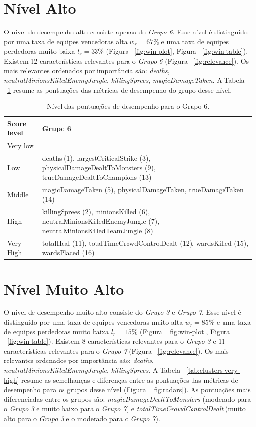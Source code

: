 \section{Nível Alto}
O nível de desempenho alto consiste apenas do \textit{Grupo 6}. Esse nível é distinguido por uma taxa de equipes vencedoras alta $w_r = 67 \%$ e uma taxa de equipes perdedoras muito baixa $l_r = 33 \%$ (Figura ~\ref{fig:win-plot}, Figura ~\ref{fig:win-table}). Existem 12 características relevantes para o \textit{Grupo 6} (Figura ~\ref{fig:relevance}). Os mais relevantes ordenados por importância são: \textit{deaths}, \textit{neutralMinionsKilledEnemyJungle}, \textit{killingSprees}, \textit{magicDamageTaken}. A Tabela ~\ref{tab:clusters-high} resume as pontuações das métricas de desempenho do grupo desse nível.

\begin{table}
  \scriptsize
  \caption{Nível das pontuações de desempenho para o Grupo 6.}
  \label{tab:clusters-high}
  \begin{tabular}{p{}p{}}
    \toprule
    \textbf{Score level} & \textbf{Grupo 6} \\
    \midrule
Very low &  \\
    \hline
Low & deaths (1), largestCriticalStrike (3), physicalDamageDealtToMonsters (9), trueDamageDealtToChampions (13) \\
    \hline
Middle & magicDamageTaken (5), physicalDamageTaken, trueDamageTaken (14)  \\
    \hline
High & killingSprees (2), minionsKilled (6), neutralMinionsKilledEnemyJungle (7), neutralMinionsKilledTeamJungle (8) \\
    \hline
Very High & totalHeal (11), totalTimeCrowdControlDealt (12), wardsKilled (15), wardsPlaced (16) \\ 
  \bottomrule
\end{tabular}
\end{table}

\section{Nível Muito Alto}
O nível de desempenho muito alto consiste do \textit{Grupo 3} e \textit{Grupo 7}. Esse nível é distinguido por uma taxa de equipes vencedoras muito alta $w_r = 85\% $ e uma taxa de equipes perdedoras muito baixa $l_r = 15\% $ (Figura ~\ref{fig:win-plot}, Figura ~\ref{fig:win-table}). Existem 8 características relevantes para o \textit{Grupo 3} e 11 características relevantes para o \textit{Grupo 7} (Figura ~\ref{fig:relevance}). Os mais relevantes ordenados por importância são: \textit{deaths}, \textit{neutralMinionsKilledEnemyJungle}, \textit{killingSprees}. A Tabela ~\ref{tab:clusters-very-high} resume as semelhanças e diferenças entre as pontuações das métricas de desempenho para os grupos desse nível (Figura ~\ref{fig:radars}). As pontuações mais diferenciadas entre os grupos são: \textit{magicDamageDealtToMonsters} (moderado para o \textit{Grupo 3} e muito baixo para o \textit{Grupo 7}) e \textit{totalTimeCrowdControlDealt} (muito alto para o \textit{Grupo 3} e o moderado para o \textit{Grupo 7}).

